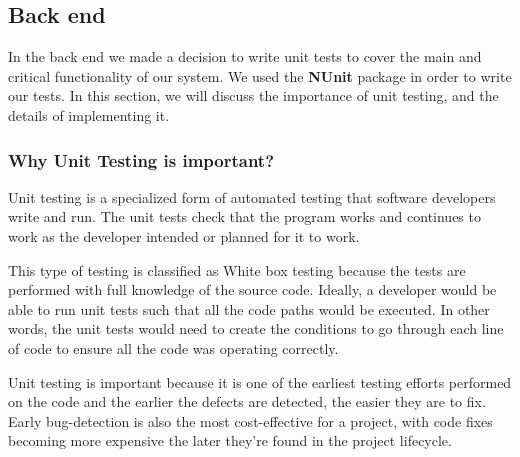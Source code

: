 \documentclass[a4paper]{report}
\begin{document}
	\subsection{Back end}\label{sec:backend-tests}
	In the back end we made a decision to write unit tests to cover the main and critical functionality of our system. We used the \textbf{NUnit} package in order to write our tests. In this section, we will discuss the importance of unit testing, and the details of implementing it.
	\subsubsection{Why Unit Testing is important?}
	\par Unit testing is a specialized form of automated testing that software developers write and run. The unit tests check that the program works and continues to work as the developer intended or planned for it to work.\newline
	\par This type of testing is classified as White box testing because the tests are performed with full knowledge of the source code. Ideally, a developer would be able to run unit tests such that all the code paths would be executed. In other words, the unit tests would need to create the conditions to go through each line of code to ensure all the code was operating correctly.\newline
	\par Unit testing is important because it is one of the earliest testing efforts performed on the code and the earlier the defects are detected, the easier they are to fix. Early bug-detection is also the most cost-effective for a project, with code fixes becoming more expensive the later they're found in the project lifecycle. %
\end{document}
